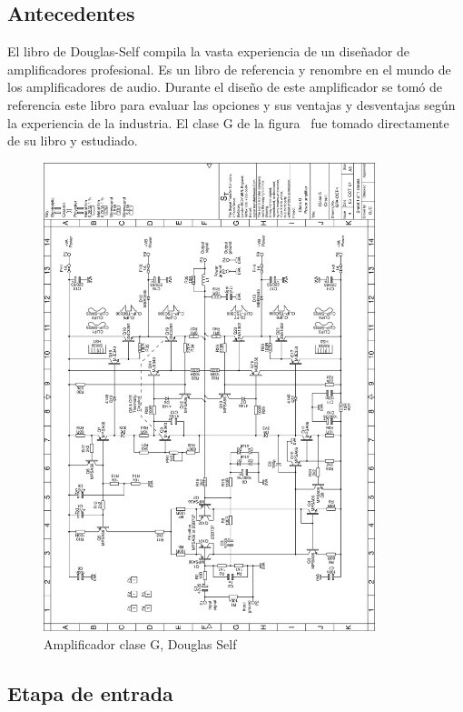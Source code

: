 \subsection{Antecedentes}

El libro de Douglas-Self compila la vasta experiencia de un diseñador de amplificadores profesional. Es un libro de referencia y renombre en el mundo de los amplificadores de audio. Durante el diseño de este amplificador se tomó de referencia este libro para evaluar las opciones y sus ventajas y desventajas según la experiencia de la industria. El clase G de la figura~ fue tomado directamente de su libro y estudiado. 

\clearpage

\begin{figure}[H]
	\centering
	\includegraphics[width=0.86\textwidth]{img/clase_g_del_libro.png}
	\caption{Amplificador clase G, Douglas Self}
	\label{fig:ampli_DS}
\end{figure}


\clearpage

\subsection{Etapa de entrada}

